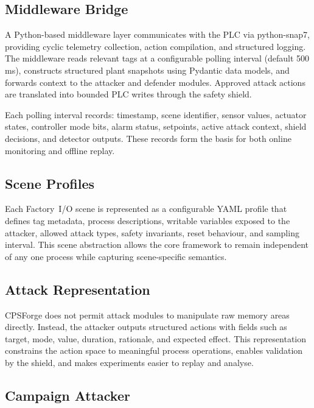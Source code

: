 \subsection{Middleware Bridge}

A Python-based middleware layer communicates with the PLC via python-snap7, providing cyclic telemetry collection, action compilation, and structured logging. The middleware reads relevant tags at a configurable polling interval (default 500\,ms), constructs structured plant snapshots using Pydantic data models, and forwards context to the attacker and defender modules. Approved attack actions are translated into bounded PLC writes through the safety shield.

Each polling interval records: timestamp, scene identifier, sensor values, actuator states, controller mode bits, alarm status, setpoints, active attack context, shield decisions, and detector outputs. These records form the basis for both online monitoring and offline replay.

\subsection{Scene Profiles}

Each Factory~I/O scene is represented as a configurable YAML profile that defines tag metadata, process descriptions, writable variables exposed to the attacker, allowed attack types, safety invariants, reset behaviour, and sampling interval. This scene abstraction allows the core framework to remain independent of any one process while capturing scene-specific semantics.

\subsection{Attack Representation}

CPSForge does not permit attack modules to manipulate raw memory areas directly. Instead, the attacker outputs structured actions with fields such as target, mode, value, duration, rationale, and expected effect. This representation constrains the action space to meaningful process operations, enables validation by the shield, and makes experiments easier to replay and analyse.

\subsection{Campaign Attacker}

